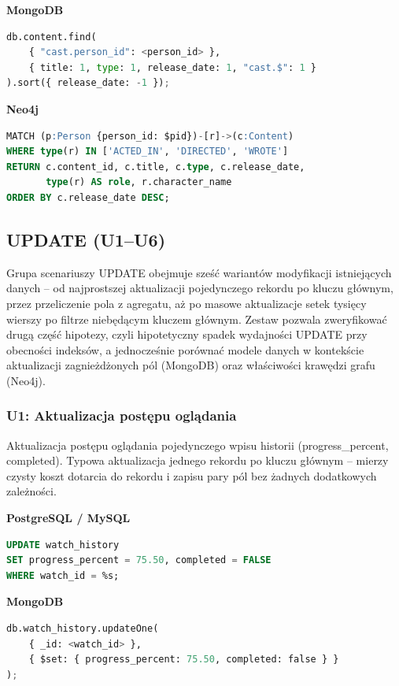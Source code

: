 \textbf{MongoDB}
\begin{lstlisting}[language=Python]
db.content.find(
    { "cast.person_id": <person_id> },
    { title: 1, type: 1, release_date: 1, "cast.$": 1 }
).sort({ release_date: -1 });
\end{lstlisting}

\textbf{Neo4j}
\begin{lstlisting}[language=SQL]
MATCH (p:Person {person_id: $pid})-[r]->(c:Content)
WHERE type(r) IN ['ACTED_IN', 'DIRECTED', 'WROTE']
RETURN c.content_id, c.title, c.type, c.release_date,
       type(r) AS role, r.character_name
ORDER BY c.release_date DESC;
\end{lstlisting}


\subsection{UPDATE (U1--U6)}

Grupa scenariuszy UPDATE obejmuje sześć wariantów modyfikacji istniejących danych --
od najprostszej aktualizacji pojedynczego rekordu po kluczu głównym, przez 
przeliczenie pola z agregatu, aż po masowe aktualizacje setek tysięcy wierszy po filtrze
niebędącym kluczem głównym. Zestaw pozwala zweryfikować drugą część hipotezy, czyli
hipotetyczny spadek wydajności UPDATE przy obecności indeksów, a jednocześnie
porównać modele danych w kontekście aktualizacji zagnieżdżonych pól (MongoDB)
oraz właściwości krawędzi grafu (Neo4j).

\subsubsection{U1: Aktualizacja postępu oglądania}

Aktualizacja postępu oglądania pojedynczego wpisu historii (progress\_percent,
completed). Typowa aktualizacja jednego rekordu po kluczu głównym -- mierzy czysty koszt
dotarcia do rekordu i zapisu pary pól bez żadnych dodatkowych zależności.

\textbf{PostgreSQL / MySQL}
\begin{lstlisting}[language=SQL]
UPDATE watch_history
SET progress_percent = 75.50, completed = FALSE
WHERE watch_id = %s;
\end{lstlisting}

\textbf{MongoDB}
\begin{lstlisting}[language=Python]
db.watch_history.updateOne(
    { _id: <watch_id> },
    { $set: { progress_percent: 75.50, completed: false } }
);
\end{lstlisting}

